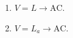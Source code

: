 \begin{enumerate}
\item $V = L \rightarrow \mathrm{AC}.$
\item $V = L_a \rightarrow \mathrm{AC}.$
\end{enumerate}
